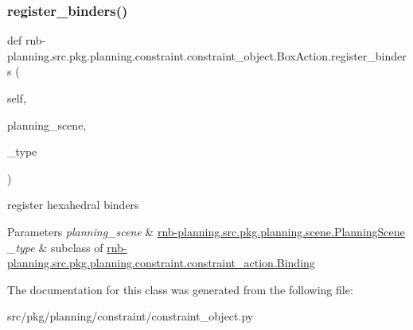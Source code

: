 \subsubsection{\texorpdfstring{register\+\_\+binders()}{register\_binders()}}
{\footnotesize\ttfamily def rnb-\/planning.\+src.\+pkg.\+planning.\+constraint.\+constraint\+\_\+object.\+Box\+Action.\+register\+\_\+binders (\begin{DoxyParamCaption}\item[{}]{self,  }\item[{}]{planning\+\_\+scene,  }\item[{}]{\+\_\+type }\end{DoxyParamCaption})}



register hexahedral binders 


\begin{DoxyParams}{Parameters}
{\em planning\+\_\+scene} & \hyperlink{classrnb-planning_1_1src_1_1pkg_1_1planning_1_1scene_1_1_planning_scene}{rnb-\/planning.\+src.\+pkg.\+planning.\+scene.\+Planning\+Scene} \\
\hline
{\em \+\_\+type} & subclass of \hyperlink{classrnb-planning_1_1src_1_1pkg_1_1planning_1_1constraint_1_1constraint__action_1_1_binding}{rnb-\/planning.\+src.\+pkg.\+planning.\+constraint.\+constraint\+\_\+action.\+Binding} \\
\hline
\end{DoxyParams}


The documentation for this class was generated from the following file\+:\begin{DoxyCompactItemize}
\item 
src/pkg/planning/constraint/constraint\+\_\+object.\+py\end{DoxyCompactItemize}
